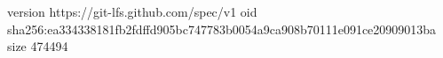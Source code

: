 version https://git-lfs.github.com/spec/v1
oid sha256:ea334338181fb2fdffd905bc747783b0054a9ca908b70111e091ce20909013ba
size 474494
